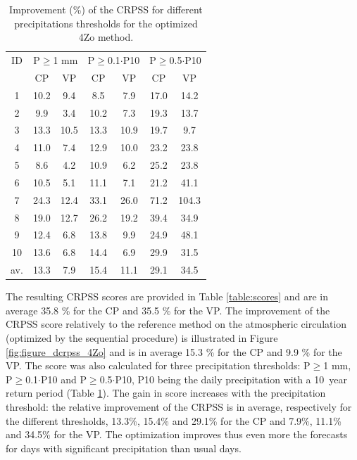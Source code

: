 \documentclass[5p]{elsarticle}
\begin{document}
\begin{table}[htb]
	\caption{Improvement (\%) of the CRPSS for different precipitations thresholds for the optimized 4Zo method.}
	\footnotesize
	\begin{center}
		\begin{tabular}{ccccccc}
			\hline 
			ID & \multicolumn{2}{c}{P\(\geq\)1 mm} & \multicolumn{2}{c}{P\(\geq\)0.1\(\cdot\)P10} & \multicolumn{2}{c}{P\(\geq\)0.5\(\cdot\)P10} \\ 
			& CP & VP & CP & VP & CP & VP \\ 
			\hline 
			1 & 10.2 & 9.4 & 8.5 & 7.9 & 17.0 & 14.2 \\ 
			2 & 9.9 & 3.4 & 10.2 & 7.3 & 19.3 & 13.7 \\ 
			3 & 13.3 & 10.5 & 13.3 & 10.9 & 19.7 & 9.7 \\ 
			4 & 11.0 & 7.4 & 12.9 & 10.0 & 23.2 & 23.8 \\ 
			5 & 8.6 & 4.2 & 10.9 & 6.2 & 25.2 & 23.8 \\ 
			6 & 10.5 & 5.1 & 11.1 & 7.1 & 21.2 & 41.1 \\ 
			7 & 24.3 & 12.4 & 33.1 & 26.0 & 71.2 & 104.3 \\ 
			8 & 19.0 & 12.7 & 26.2 & 19.2 & 39.4 & 34.9 \\ 
			9 & 12.4 & 6.8 & 13.8 & 9.9 & 24.9 & 48.1 \\ 
			10 & 13.6 & 6.8 & 14.4 & 6.9 & 29.9 & 31.5 \\ 
			\hline 
			av. & 13.3 & 7.9 & 15.4 & 11.1 & 29.1 & 34.5 \\ 
			\hline 
		\end{tabular} 
	\end{center}
	\label{table:scores_thresholds_4Zo}
\end{table}

The resulting CRPSS scores are provided in Table \ref{table:scores} and are in average 35.8 \% for the CP and 35.5 \% for the VP. The improvement of the CRPSS score relatively to the reference method on the atmospheric circulation (optimized by the sequential procedure) is illustrated in Figure \ref{fig:figure_dcrpss_4Zo} and is in average 15.3 \% for the CP and 9.9 \% for the VP. The score was also calculated for three precipitation thresholds: P\(\geq\)1 mm, P\(\geq\)0.1\(\cdot\)P10 and P\(\geq\)0.5\(\cdot\)P10, P10 being the daily precipitation with a 10~year return period (Table \ref{table:scores_thresholds_4Zo}). The gain in score increases with the precipitation threshold: the relative improvement of the CRPSS is in average, respectively for the different thresholds, 13.3\%, 15.4\% and 29.1\% for the CP and 7.9\%, 11.1\% and 34.5\% for the VP. The optimization improves thus even more the forecasts for days with significant precipitation than usual days.
\end{document}
